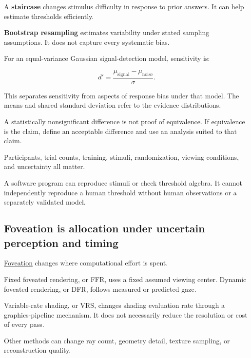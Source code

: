 \hypertarget{04-visual-computing-ii-ch042-experimental-design-determines-what-the-result-supports}{}

A \textbf{staircase} changes stimulus difficulty in response to prior answers. It can help estimate thresholds efficiently.

\textbf{Bootstrap resampling} estimates variability under stated sampling assumptions. It does not capture every systematic bias.

For an equal-variance Gaussian signal-detection model, sensitivity is:

\[
d'=\frac{\mu_{\mathrm{signal}}-\mu_{\mathrm{noise}}}{\sigma}.
\]

This separates sensitivity from aspects of response bias under that model. The means and shared standard deviation refer to the evidence distributions.

A statistically nonsignificant difference is not proof of equivalence. If equivalence is the claim, define an acceptable difference and use an analysis suited to that claim.

Participants, trial counts, training, stimuli, randomization, viewing conditions, and uncertainty all matter.

A software program can reproduce stimuli or check threshold algebra. It cannot independently reproduce a human threshold without human observations or a separately validated model.

\subsection{Foveation is allocation under uncertain perception and timing}\label{04-visual-computing-ii-ch042-foveation-is-allocation-under-uncertain-perception-and-timing}

\hypertarget{04-visual-computing-ii-ch042-foveation-is-allocation-under-uncertain-perception-and-timing}{}

\hyperref[appendix-5878b813b732]{Foveation} changes where computational effort is spent.

Fixed foveated rendering, or FFR, uses a fixed assumed viewing center. Dynamic foveated rendering, or DFR, follows measured or predicted gaze.

Variable-rate shading, or VRS, changes shading evaluation rate through a graphics-pipeline mechanism. It does not necessarily reduce the resolution or cost of every pass.

Other methods can change ray count, geometry detail, texture sampling, or reconstruction quality.

